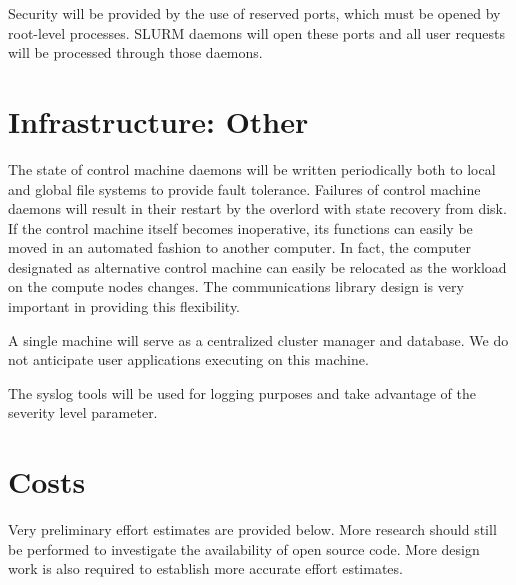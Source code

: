 Security will be provided by the use of reserved ports, which must be opened by
root-level processes. SLURM daemons will open these ports and all user requests
will be processed through those daemons. 

\section{Infrastructure: Other}

The state of control machine daemons will be written periodically both to local
and global file systems to provide fault tolerance. Failures of control machine
daemons will result in their restart by the overlord with state recovery from
disk. If the control machine itself becomes inoperative, its functions can
easily be moved in an automated fashion to another computer. In fact, the
computer designated as alternative control machine can easily be relocated as
the workload on the compute nodes changes. The communications library design is
very important in providing this flexibility.

A single machine will serve as a centralized cluster manager and database. We
do not anticipate user applications executing on this machine. 

The syslog tools will be used for logging purposes and take advantage of the 
severity level parameter.

\section{Costs}

Very preliminary effort estimates are provided below. More research should
still be performed to investigate the availability of open source code. More
design work is also required to establish more accurate effort estimates.

